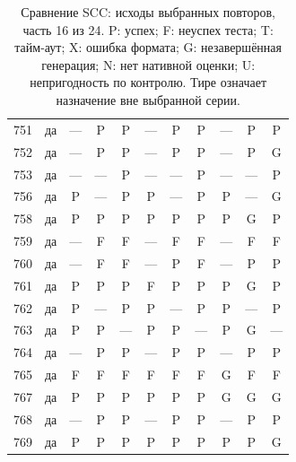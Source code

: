 \begin{table}[p]
\begin{tabular*}{\textwidth}{@{\extracolsep{\fill}}rc*{9}{c}@{}}
751 & да & — & P & P & — & P & P & — & P & P\\
752 & да & — & P & P & — & P & P & — & P & G\\
753 & да & — & — & P & — & — & P & — & — & P\\
756 & да & P & — & P & P & — & P & P & — & G\\
758 & да & P & P & P & P & P & P & P & G & P\\
759 & да & — & F & F & — & F & F & — & F & F\\
760 & да & — & F & F & — & P & F & — & P & P\\
761 & да & P & P & P & F & P & P & P & G & P\\
762 & да & P & — & P & P & — & P & P & — & P\\
763 & да & P & P & — & P & P & — & P & G & —\\
764 & да & — & P & P & — & P & P & — & P & P\\
765 & да & F & F & F & F & F & F & G & F & F\\
767 & да & P & P & P & P & P & P & G & G & G\\
768 & да & — & P & P & — & P & P & — & P & P\\
769 & да & P & P & P & P & P & P & P & P & G\\
\bottomrule\end{tabular*}
\caption{Сравнение SCC: исходы выбранных повторов, часть 16 из 24. P: успех; F: неуспех теста; T: тайм-аут; X: ошибка формата; G: незавершённая генерация; N: нет нативной оценки; U: непригодность по контролю. Тире означает назначение вне выбранной серии.}
\end{table}
\clearpage
